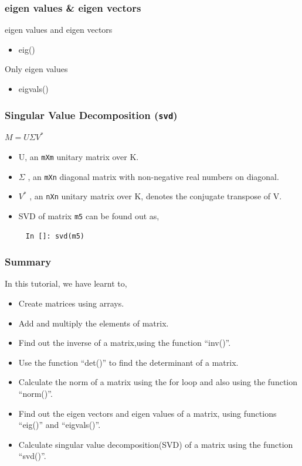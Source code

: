 \documentclass[presentation]{beamer}
\begin{document}
\begin{frame}
\frametitle{eigen values \& eigen vectors}
\label{sec-9}

  eigen values and eigen vectors

\begin{itemize}
\item eig()
\end{itemize}
 
  Only eigen values

\begin{itemize}
\item eigvals()
\end{itemize}
\end{frame}
\begin{frame}[fragile]
\frametitle{Singular Value Decomposition (\verb~svd~)}
\label{sec-10}

    $M = U \Sigma V^*$

\begin{itemize}
\item U, an \verb~mXm~ unitary matrix over K.
\item $\Sigma$
        , an \verb~mXn~ diagonal matrix with non-negative real numbers on diagonal.
\item $V^*$
        , an \verb~nXn~ unitary matrix over K, denotes the conjugate transpose of V.
\item SVD of matrix \verb~m5~ can be found out as,
\end{itemize}
\begin{verbatim}
     In []: svd(m5)
\end{verbatim}
\end{frame}
\begin{frame}
\frametitle{Summary}
\label{sec-11}

  In this tutorial, we have learnt to, 


\begin{itemize}
\item Create matrices using arrays.
\item Add and multiply the elements of matrix.
\item Find out the inverse of a matrix,using the function ``inv()''.
\item Use the function ``det()'' to find the determinant of a matrix.
\item Calculate the norm of a matrix using the for loop and also using 
    the function ``norm()''.
\item Find out the eigen vectors and eigen values of a matrix, using 
    functions ``eig()'' and ``eigvals()''.
\item Calculate singular value decomposition(SVD) of a matrix using the 
    function ``svd()''.
\end{itemize}
 
\end{frame}
\end{document}
